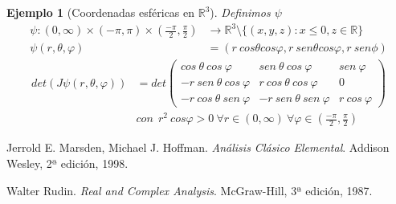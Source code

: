\documentclass[11pt, a4paper]{article}
\newif\IfInSansMode
\newcommand{\R}{\mathbb{R}} \newcommand{\N}{\mathbb{N}}
\theoremstyle{theorem-style}
\theoremstyle{definition-style}
\theoremstyle{remark-style}
\theoremstyle{example-style}
\newtheorem{ejemplo}{Ejemplo}[section]
\begin{document}
\begin{ejemplo}[Coordenadas esféricas en $\R^3$]
  Definimos $\psi$
\begin{align*}
  \psi : (0, \infty) \times (-\pi, \pi) \times \left( \frac{-\pi}{2},
  \frac{\pi}{2} \right)
&\rightarrow \R^3 \setminus \{(x, y, z) : x \leq 0, z \in \R \} \\
\psi(r, \theta, \varphi) &= (r \ cos \theta cos \varphi, r \ sen \theta cos
                           \varphi, r \ sen \phi )
\end{align*}
\begin{align*}det(J \psi (r, \theta, \varphi)) &= det
\begin{pmatrix}
  cos \ \theta \ cos \ \varphi & sen \ \theta \ cos \ \varphi & sen \ \varphi \\
  -r \ sen \ \theta \ cos \ \varphi & r \ cos \ \theta \ cos \ \varphi & 0 \\
  -r \ cos \ \theta \ sen \ \varphi & -r \ sen \ \theta \ sen \ \varphi & r \
  cos \ \varphi
\end{pmatrix} \\
  &con \ \ r^2 \ cos \varphi > 0 \ \forall r \in (0, \infty) \ \forall \varphi \in \left( \frac{-\pi}{2}, \frac{\pi}{2} \right)
\end{align*}
\end{ejemplo}


\newpage

\begin{thebibliography}{9}

  Jerrold E. Marsden, Michael  J. Hoffman.
  \emph{Análisis Clásico Elemental}.
  Addison Wesley,
  2ª edición,
  1998.

  Walter Rudin.
  \emph{Real and Complex Analysis}.
  McGraw-Hill,
  3ª edición,
  1987.

\end{thebibliography}



\end{document}
